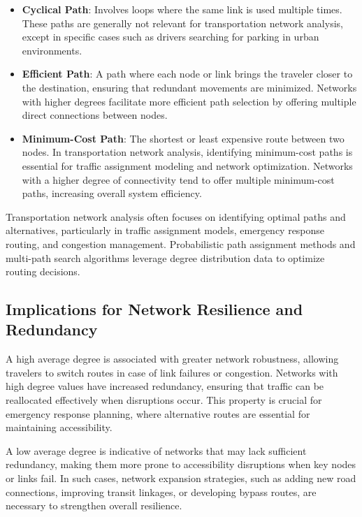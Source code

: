 \begin{itemize}
    \item \textbf{Cyclical Path}: Involves loops where the same link is used multiple times. These paths are generally not relevant for transportation network analysis, except in specific cases such as drivers searching for parking in urban environments.
    
    \item \textbf{Efficient Path}: A path where each node or link brings the traveler closer to the destination, ensuring that redundant movements are minimized. Networks with higher degrees facilitate more efficient path selection by offering multiple direct connections between nodes.
    
    \item \textbf{Minimum-Cost Path}: The shortest or least expensive route between two nodes. In transportation network analysis, identifying minimum-cost paths is essential for traffic assignment modeling and network optimization. Networks with a higher degree of connectivity tend to offer multiple minimum-cost paths, increasing overall system efficiency.
\end{itemize}

Transportation network analysis often focuses on identifying optimal paths and alternatives, particularly in traffic assignment models, emergency response routing, and congestion management. Probabilistic path assignment methods \cite{dial1971, taylor1979} and multi-path search algorithms \cite{chen2016} leverage degree distribution data to optimize routing decisions.
\subsection{Implications for Network Resilience and Redundancy}
A high average degree is associated with greater network robustness, allowing travelers to switch routes in case of link failures or congestion. Networks with high degree values have increased redundancy, ensuring that traffic can be reallocated effectively when disruptions occur. This property is crucial for emergency response planning, where alternative routes are essential for maintaining accessibility.

A low average degree is indicative of networks that may lack sufficient redundancy, making them more prone to accessibility disruptions when key nodes or links fail. In such cases, network expansion strategies, such as adding new road connections, improving transit linkages, or developing bypass routes, are necessary to strengthen overall resilience.

